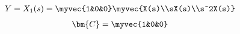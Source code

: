 \begin{enumerate}[label=\thesection.\arabic*.,ref=\thesection.\theenumi]
\begin{align}
Y=X_{1}(s)
=\myvec{1&0&0} \myvec{X(s)\\sX(s)\\s^2X(s)}
\end{align}
\begin{align}
\bm{C}=\myvec{1&0&0}
\end{align}
\end{enumerate}